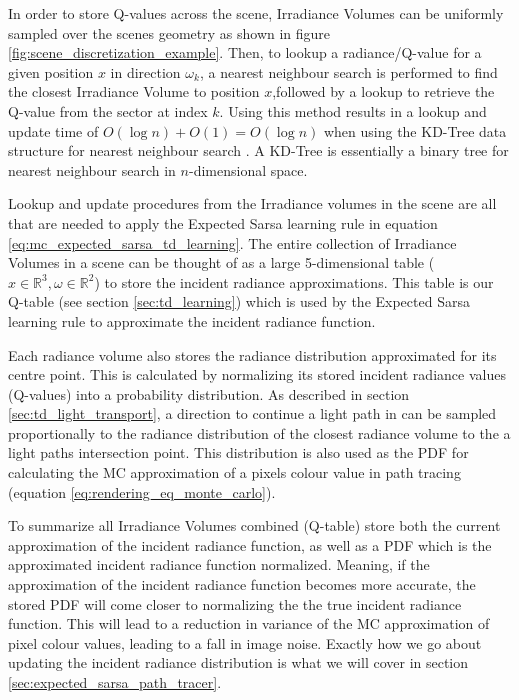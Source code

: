 \documentclass[../dissertation.tex]{subfiles}
\begin{document}
In order to store Q-values across the scene, Irradiance Volumes can be uniformly sampled over the scenes geometry as shown in figure \ref{fig:scene_discretization_example}. Then, to lookup a radiance/Q-value for a given position $x$ in direction $\omega_k$, a nearest neighbour search is performed to find the closest Irradiance Volume to position $x$,followed by a lookup to retrieve the Q-value from the sector at index $k$. Using this method results in a lookup and update time of $O(\log n) + O(1) = O(\log n)$ when using the KD-Tree data structure for nearest neighbour search \cite{bentley1975multidimensional}. A KD-Tree is essentially a binary tree for nearest neighbour search in $n$-dimensional space. 

Lookup and update procedures from the Irradiance volumes in the scene are all that are needed to apply the Expected Sarsa learning rule in equation \ref{eq:mc_expected_sarsa_td_learning}. The entire collection of Irradiance Volumes in a scene can be thought of as a large 5-dimensional table ($x \in \mathbb{R}^3, \omega \in \mathbb{R}^2$) to store the incident radiance approximations. This table is our Q-table (see section \ref{sec:td_learning}) which is used by the Expected Sarsa learning rule to approximate the incident radiance function.

Each radiance volume also stores the radiance distribution approximated for its centre point. This is calculated by normalizing its stored incident radiance values (Q-values) into a probability distribution. As described in section \ref{sec:td_light_transport}, a direction to continue a light path in can be sampled proportionally to the radiance distribution of the closest radiance volume to the a light paths intersection point. This distribution is also used as the PDF for calculating the MC approximation of a pixels colour value in path tracing (equation \ref{eq:rendering_eq_monte_carlo}).

To summarize all Irradiance Volumes combined (Q-table) store both the current approximation of the incident radiance function, as well as a PDF which is the approximated incident radiance function normalized. Meaning, if the approximation of the incident radiance function becomes more accurate, the stored PDF will come closer to normalizing the the true incident radiance function. This will lead to a reduction in variance of the MC approximation of pixel colour values, leading to a fall in image noise. Exactly how we go about updating the incident radiance distribution is what we will cover in section \ref{sec:expected_sarsa_path_tracer}.
\end{document}
